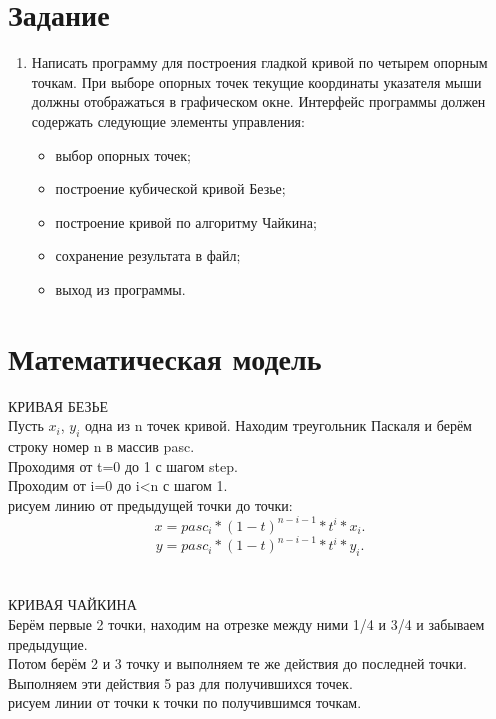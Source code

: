 \documentclass[14pt, a4paper]{extreport}
\begin{document}
\author{Савонин~М.В.}
\maketitle

\chapter{Задание}

\begin{enumerate}

	\item
	Написать программу для построения гладкой кривой по четырем опорным точкам. При выборе опорных точек текущие координаты указателя мыши 	должны отображаться в графическом окне. Интерфейс программы должен содержать следующие элементы управления:
	\begin{itemize}
		\item выбор опорных точек;
		\item построение кубической кривой Безье;
		\item построение кривой по алгоритму Чайкина;
		\item сохранение результата в файл;
		\item выход из программы.
	\end{itemize}

\end{enumerate}

\chapter{Математическая модель}

\MakeUppercase{Кривая Безье}\\
Пусть $x_i$, $y_i$ одна из n точек кривой.
Находим треугольник Паскаля и берём строку номер n в массив pasc.\\
Проходимя от t=0 до 1 с шагом step.\\
Проходим от i=0 до i<n с шагом 1.\\
рисуем линию от предыдущей точки до точки:
$$ x = pasc_{i}*(1-t)^{n-i-1}*t^{i}*x_i .$$
$$ y = pasc_{i}*(1-t)^{n-i-1}*t^{i}*y_i .$$\\
\\
\MakeUppercase{Кривая Чайкина}\\
Берём первые 2 точки, находим на отрезке между ними 1/4 и 3/4 и забываем предыдущие.\\
Потом берём 2 и 3 точку и выполняем те же действия до последней точки.\\
Выполняем эти действия 5 раз для получившихся точек.\\
рисуем линии от точки к точки по получившимся точкам.
\end{document}
